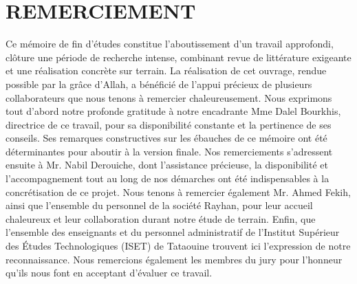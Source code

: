 \chapter*{REMERCIEMENT}
\thispagestyle{MyStyle}

Ce mémoire de fin d’études constitue l'aboutissement d'un travail approfondi, clôture une période de recherche intense, combinant revue de littérature exigeante et une réalisation concrète sur terrain. La réalisation de cet ouvrage, rendue possible par la grâce d'Allah, a bénéficié de l'appui précieux de plusieurs collaborateurs que nous tenons à remercier chaleureusement.
Nous exprimons tout d'abord notre profonde gratitude à notre encadrante Mme Dalel Bourkhis, directrice de ce travail, pour sa disponibilité constante et la pertinence de ses conseils. Ses remarques constructives sur les ébauches de ce mémoire ont été déterminantes pour aboutir à la version finale.
Nos remerciements s'adressent ensuite à Mr. Nabil Derouiche, dont l'assistance précieuse, la disponibilité et l'accompagnement tout au long de nos démarches ont été indispensables à la concrétisation de ce projet.
Nous tenons à remercier également Mr. Ahmed Fekih, ainsi que l'ensemble du personnel de la société Rayhan, pour leur accueil chaleureux et leur collaboration durant notre étude de terrain.
Enfin, que l'ensemble des enseignants et du personnel administratif de l’Institut Supérieur des Études Technologiques (ISET) de Tataouine trouvent ici l'expression de notre reconnaissance. Nous remercions également les membres du jury pour l'honneur qu'ils nous font en acceptant d'évaluer ce travail.
\par
